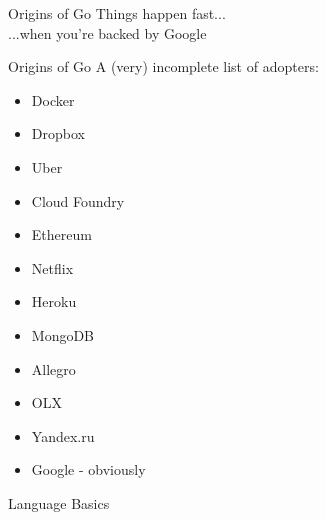 \documentclass[pdf,xcolor=dvipsnames,noparindent]{beamer}
\begin{document}
\begin{frame}{Origins of Go}
  \pause
  Things happen fast...\\
  \pause
  ...when you're backed by Google
\end{frame}

\begin{frame}{Origins of Go}
  \pause
  A (very) incomplete list of adopters:
  \begin{itemize}
  \item Docker
    \pause
  \item Dropbox
    \pause
  \item Uber
    \pause
  \item Cloud Foundry
    \pause
  \item Ethereum
    \pause
  \item Netflix
    \pause
  \item Heroku
    \pause
  \item MongoDB
    \pause
  \item Allegro
    \pause
  \item OLX
    \pause
  \item Yandex.ru
    \pause
  \item Google - obviously
  \end{itemize}
\end{frame}

\begin{frame}{Language Basics}
  
\end{frame}
\end{document}
